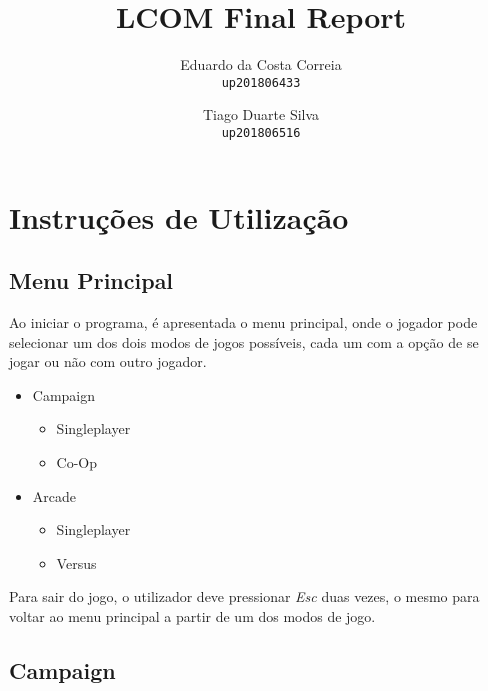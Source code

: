 \documentclass{report}
\begin{document}
\title{LCOM Final Report}
	\author{Eduardo da Costa Correia\\
	\texttt{up201806433}
	\and
	Tiago Duarte Silva\\
	\texttt{up201806516}}   
\maketitle

\tableofcontents

\chapter{Instruções de Utilização} 

\section{Menu Principal}

Ao iniciar o programa, é apresentada o menu principal, onde o jogador pode selecionar um dos dois modos de jogos possíveis, cada um com a opção de se jogar ou não com outro jogador.

\begin{itemize}
	\item Campaign

	\begin{itemize}
		\item Singleplayer 
		\item Co-Op
	\end{itemize}
	
	\item Arcade
	
	\begin{itemize}
		\item Singleplayer 
		\item Versus
	\end{itemize}
\end{itemize}

Para sair do jogo, o utilizador deve pressionar \textit{Esc} duas vezes, o mesmo para voltar ao menu principal a partir de um dos modos de jogo.


\section{Campaign}
\end{document}
